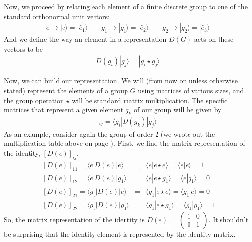 \documentclass[12pt,epsf]{article}
\def\nolabel{\nonumber }
\def\nolabel{\nonumber }
\begin{document}
Now, we proceed by relating each element of a finite discrete group to
one of the standard orthonormal unit vectors:
\begin{eqnarray}
e \rightarrow |e\rangle = |\hat e_1\rangle \qquad g_1 \rightarrow
|g_1\rangle = |\hat e_2\rangle \qquad g_2 \rightarrow |g_2\rangle  =
|\hat e_3\rangle \nolabel 
\end{eqnarray}
And we define the way an element in a representation $D(G)$ acts on
these vectors to be
\begin{eqnarray}
D(g_i)|g_j\rangle = |g_i \star g_j\rangle \nolabel 
\end{eqnarray}

Now, we can build our representation.  We will (from now on unless
otherwise stated) represent the elements of a group $G$ using matrices
of various sizes, and the group operation $\star$ will be standard
matrix multiplication.	The specific matrices that represent a given
element $g_k$ of our group will be given by 
\begin{eqnarray}
[D(g_k)]_{ij} = \langle g_i |D(g_k)|g_j\rangle \label{eq:regrep}
\end{eqnarray}
As an example, consider again the group of order 2 (we wrote out the
multiplication table above on page \pageref{order2}).  First, we find
the matrix representation of the identity, $[D(e)]_{ij}$, 
\begin{eqnarray}
\;[D(e)]_{11} = \langle e|D(e)|e\rangle &=& \langle e|e\star e\rangle =
\langle e| e\rangle = 1 \nolabel \\
\;[D(e)]_{12} = \langle e|D(e)|g_1\rangle &=& \langle e|e\star
g_1\rangle = \langle e| g_1\rangle = 0\nolabel	\\
\; [D(e)]_{21} = \langle g_1|D(e)|e\rangle &=& \langle g_1|e\star
e\rangle = \langle g_1|e\rangle = 0 \nolabel \\
\; [D(e)]_{22} = \langle g_1|D(e)|g_1\rangle &=& \langle g_1|e\star
g_1\rangle = \langle g_1|g_1\rangle = 1\nolabel 
\end{eqnarray}
So, the matrix representation of the identity is $D(e)~\dot{=}
\begin{pmatrix}
1 & 0 \\ 0 & 1
\end{pmatrix}$.  It shouldn't be surprising that the identity element
is represented by the identity	matrix.  
\end{document}
